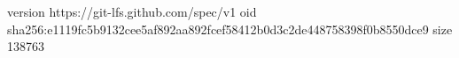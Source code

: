 version https://git-lfs.github.com/spec/v1
oid sha256:e1119fc5b9132cee5af892aa892fcef58412b0d3c2de448758398f0b8550dce9
size 138763
